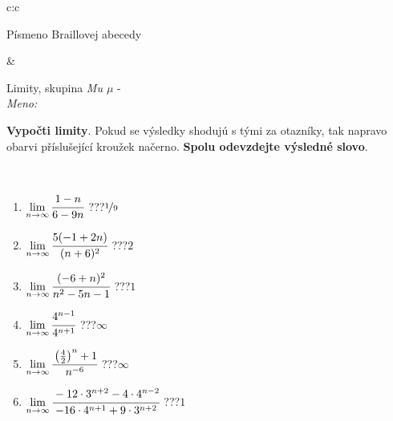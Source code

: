 \documentclass[10pt]{report}
\begin{document}
\begin{tabular}{c:c}
\begin{minipage}[c][104.5mm][t]{0.5\linewidth}
\begin{center}
\begin{minipage}{0.20\linewidth}
\begin{center}
{\small Písmeno Braillovej abecedy}
\end{center}
\end{minipage}
\end{center}
\end{minipage}
&
\begin{minipage}[c][104.5mm][t]{0.5\linewidth}
\begin{center}
\vspace{7mm}
{\huge Limity, skupina \textit{Mu $\mu$} -}\\[5mm]
\textit{Meno:}\phantom{xxxxxxxxxxxxxxxxxxxxxxxxxxxxxxxxxxxxxxxxxxxxxxxxxxxxxxxxxxxxxxxxx}\\[5mm]
\begin{minipage}{0.95\linewidth}
\begin{center}
\textbf{Vypočti limity}. Pokud se výsledky shodujú s tými za otazníky, tak napravo\\obarvi příslušející kroužek načerno. \textbf{Spolu odevzdejte výsledné slovo}.
\end{center}
\end{minipage}
\\[1mm]
\begin{minipage}{0.79\linewidth}
\begin{center}
\begin{varwidth}{\linewidth}
\begin{enumerate}
\normalsize
\item $\lim\limits_{n\to\infty}\cfrac{1-n}{6-9n}$\quad \dotfill\; ???\;\dotfill \quad $\nicefrac{1}{9}$
\item $\lim\limits_{n\to\infty}\cfrac{5(-1+2n)}{(n+6)^2}$\quad \dotfill\; ???\;\dotfill \quad $2$
\item $\lim\limits_{n\to\infty}\cfrac{(-6+n)^2}{n^2-5n-1}$\quad \dotfill\; ???\;\dotfill \quad $1$
\item $\lim\limits_{n\to\infty}\cfrac{4^{n-1}}{4^{n+1}}$\quad \dotfill\; ???\;\dotfill \quad $\infty$
\item $\lim\limits_{n\to\infty}\cfrac{\left(\frac{4}{2}\right)^n +1}{n^{-6}}$\quad \dotfill\; ???\;\dotfill \quad $\infty$
\item $\lim\limits_{n\to\infty}\cfrac{-12\cdot 3^{n+2}-4\cdot 4^{n-2}}{-16\cdot 4^{n+1}+9\cdot 3^{n+2}}$\quad \dotfill\; ???\;\dotfill \quad $1$
\end{enumerate}
\end{varwidth}
\end{center}
\end{minipage}
\begin{minipage}{0.20\linewidth}

\end{minipage}
\end{center}
\end{minipage}
\end{tabular}
\end{document}
